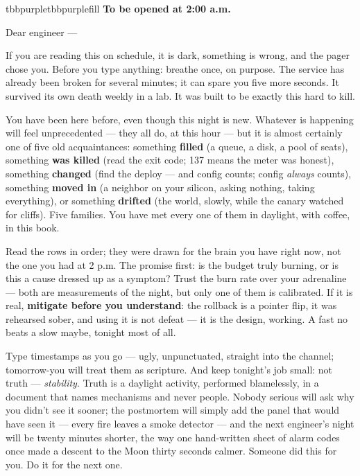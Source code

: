 \begin{calloutbox}{tbbpurple}{tbbpurplefill}
{\normalsize\bfseries\color{tbbpurple}To be opened at 2:00 a.m.}\par\vspace{3pt}
Dear engineer —

If you are reading this on schedule, it is dark, something is wrong, and the pager chose you. Before you type anything: breathe once, on purpose. The service has already been broken for several minutes; it can spare you five more seconds. It survived its own death weekly in a lab. It was built to be exactly this hard to kill.

You have been here before, even though this night is new. Whatever is happening will feel unprecedented — they all do, at this hour — but it is almost certainly one of five old acquaintances: something \textbf{filled} (a queue, a disk, a pool of seats), something \textbf{was killed} (read the exit code; 137 means the meter was honest), something \textbf{changed} (find the deploy — and config counts; config \textit{always} counts), something \textbf{moved in} (a neighbor on your silicon, asking nothing, taking everything), or something \textbf{drifted} (the world, slowly, while the canary watched for cliffs). Five families. You have met every one of them in daylight, with coffee, in this book.

Read the rows in order; they were drawn for the brain you have right now, not the one you had at 2 p.m. The promise first: is the budget truly burning, or is this a cause dressed up as a symptom? Trust the burn rate over your adrenaline — both are measurements of the night, but only one of them is calibrated. If it is real, \textbf{mitigate before you understand}: the rollback is a pointer flip, it was rehearsed sober, and using it is not defeat — it is the design, working. A fast no beats a slow maybe, tonight most of all.

Type timestamps as you go — ugly, unpunctuated, straight into the channel; tomorrow-you will treat them as scripture. And keep tonight's job small: not truth — \textit{stability}. Truth is a daylight activity, performed blamelessly, in a document that names mechanisms and never people. Nobody serious will ask why you didn't see it sooner; the postmortem will simply add the panel that would have seen it — every fire leaves a smoke detector — and the next engineer's night will be twenty minutes shorter, the way one hand-written sheet of alarm codes once made a descent to the Moon thirty seconds calmer. Someone did this for you. Do it for the next one.


\end{calloutbox}
